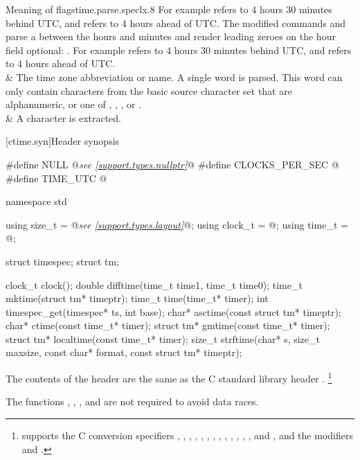 \begin{LongTable}{Meaning of  flags}{time.parse.spec}{lx{.8\hsize}}
For example  refers to 4 hours 30 minutes behind UTC,
and  refers to 4 hours ahead of UTC\@.
The modified commands  and 
parse a \tcode{:} between the hours and minutes
and render leading zeroes on the hour field optional:
.
For example  refers to 4 hours 30 minutes behind UTC,
and  refers to 4 hours ahead of UTC.
\\ \rowsep
{} &
The time zone abbreviation or name.
A single word is parsed.
This word can only contain characters
from the basic source character set
that are alphanumeric, or one of
, , , or .
\\ \rowsep
\tcode{\%\%} &
A \tcode{\%} character is extracted.
\\
\end{LongTable}


[ctime.syn]{Header  synopsis}

%
%
%
%
%
%
%
%
%
%
%
%
%
%
%
%
%
%
%
\begin{codeblock}
#define NULL @\textit{see \ref{support.types.nullptr}}@
#define CLOCKS_PER_SEC @\seebelow@
#define TIME_UTC @\seebelow@

namespace std {
  using size_t = @\textit{see \ref{support.types.layout}}@;
  using clock_t = @\seebelow@;
  using time_t = @\seebelow@;

  struct timespec;
  struct tm;

  clock_t clock();
  double difftime(time_t time1, time_t time0);
  time_t mktime(struct tm* timeptr);
  time_t time(time_t* timer);
  int timespec_get(timespec* ts, int base);
  char* asctime(const struct tm* timeptr);
  char* ctime(const time_t* timer);
  struct tm* gmtime(const time_t* timer);
  struct tm* localtime(const time_t* timer);
  size_t strftime(char* s, size_t maxsize, const char* format, const struct tm* timeptr);
}
\end{codeblock}

\pnum
The contents of the header  are the same as the C standard library header .%
\footnote{ supports the C conversion specifiers
, , , , , , ,
, , , , , , and
, and the modifiers  and .}

\pnum
The functions , , , and
 are not required to avoid data
races.

